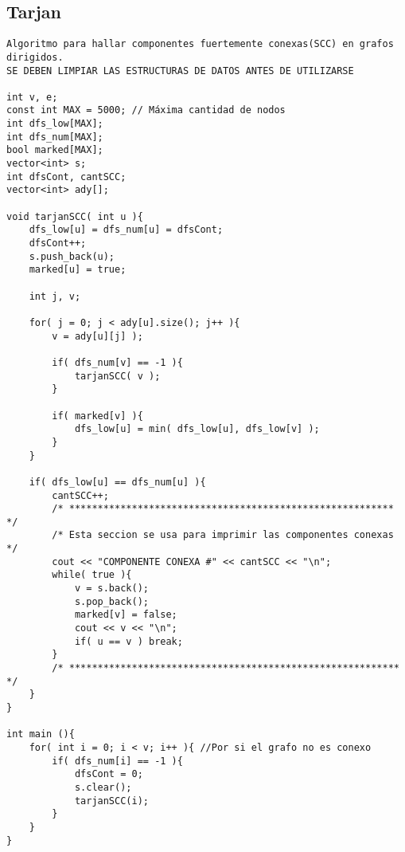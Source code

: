 \documentclass[10pt,letterpaper,twocolumn,twosided]{article}
\begin{document}
\subsection{Tarjan}
\begin{lstlisting}
Algoritmo para hallar componentes fuertemente conexas(SCC) en grafos dirigidos.
SE DEBEN LIMPIAR LAS ESTRUCTURAS DE DATOS ANTES DE UTILIZARSE

int v, e; 
const int MAX = 5000; // Máxima cantidad de nodos
int dfs_low[MAX];
int dfs_num[MAX];
bool marked[MAX];
vector<int> s;
int dfsCont, cantSCC;
vector<int> ady[];
	
void tarjanSCC( int u ){
	dfs_low[u] = dfs_num[u] = dfsCont;
	dfsCont++;
	s.push_back(u);
	marked[u] = true;
		
	int j, v;
		
	for( j = 0; j < ady[u].size(); j++ ){
		v = ady[u][j] );
			
		if( dfs_num[v] == -1 ){
			tarjanSCC( v );
		}
			
		if( marked[v] ){
			dfs_low[u] = min( dfs_low[u], dfs_low[v] );
		}
	}
		
	if( dfs_low[u] == dfs_num[u] ){
		cantSCC++;
        /* ********************************************************* */
        /* Esta seccion se usa para imprimir las componentes conexas */
		cout << "COMPONENTE CONEXA #" << cantSCC << "\n";
		while( true ){
			v = s.back();
			s.pop_back();
			marked[v] = false;
			cout << v << "\n";
			if( u == v ) break;
		}
        /* ********************************************************** */
	}	
}

int main (){
    for( int i = 0; i < v; i++ ){ //Por si el grafo no es conexo
        if( dfs_num[i] == -1 ){
            dfsCont = 0;
            s.clear();
            tarjanSCC(i);
        }
    }
}
	



\end{lstlisting}
\end{document}
